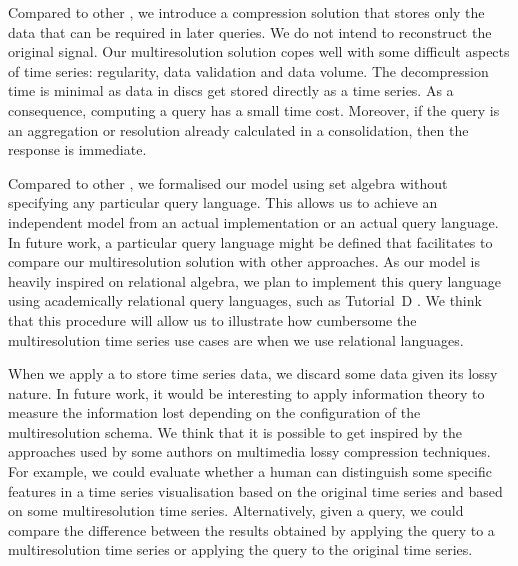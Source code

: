 Compared to other , we introduce a compression solution
that stores only the data that can be required in later queries. We do
not intend to reconstruct the original signal. Our multiresolution
solution copes well with some difficult aspects of time series:
regularity, data validation and data volume.  The decompression time
is minimal as data in discs get stored directly as a time series. As a
consequence, computing a query has a small time cost. Moreover, if the
query is an aggregation or resolution already calculated in a
 consolidation, then the response is immediate.


Compared to other , we formalised our model using set
algebra without specifying any particular query language.  This allows
us to achieve an independent model from an actual implementation or an
actual query language.  In future work, a particular query language
might be defined that facilitates to compare our multiresolution
solution with other approaches. As our model is heavily inspired on
relational algebra, we plan to implement this query language using
academically relational query languages, such as Tutorial~D
\cite{date:introduction}.  We think that this procedure will allow us
to illustrate how cumbersome the multiresolution time series use cases
are when we use relational languages.


When we apply a  to store time series data, we discard
some data given its lossy nature.  In future work, it would be
interesting to apply information theory to measure the information
lost depending on the configuration of the multiresolution schema. We
think that it is possible to get inspired by the approaches used by
some authors on multimedia lossy compression techniques. For example,
we could evaluate whether a human can distinguish some specific
features in a time series visualisation based on the original time
series and based on some multiresolution time series. Alternatively,
given a query, we could compare the difference between the results
obtained by applying the query to a multiresolution time series or
applying the query to the original time series.



